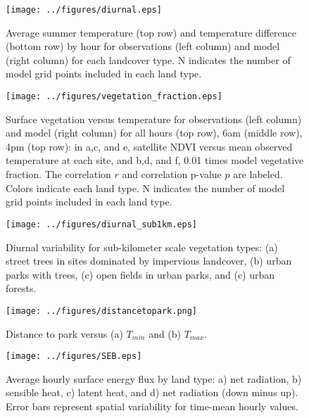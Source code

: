 \documentclass[draft,linenumbers]{agujournal}
\begin{document}
\begin{figure}[h]
\centering
\texttt{[image: ../figures/diurnal.eps]}
\caption{Average summer temperature (top row) and temperature difference (bottom row) by hour for observations (left column) and model (right column) for each landcover type. N indicates the number of model grid points included in each land type. }
\label{fig:diurnal}
\end{figure}


\begin{figure}[h]
\centering
\texttt{[image: ../figures/vegetation\_fraction.eps]}
\caption{Surface vegetation versus temperature for observations (left column) and model (right column) for all hours (top row), 6am (middle row), 4pm (top row): in a,c, and e, satellite NDVI versus mean observed temperature at each site, and b,d, and f, 0.01 times model vegetative fraction. The correlation $r$ and correlation p-value $p$ are labeled. Colors indicate each land type. N indicates the number of model grid points included in each land type.}
\label{fig:veg}
\end{figure}

\begin{figure}
\centering
\texttt{[image: ../figures/diurnal\_sub1km.eps]}
\caption{Diurnal variability for sub-kilometer scale vegetation types: (a) street trees in sites dominated by impervious landcover, (b) urban parks with trees, (c) open fields in urban parks, and (c) urban forests. }
\label{fig:diurnal_urbanforests_etc}
\end{figure}

\begin{figure}
\centering
\texttt{[image: ../figures/distancetopark.png]}
\caption{Distance to park versus (a) $T_{min}$ and (b) $T_{max}$.}
\label{fig:distance to park}
\end{figure}


\begin{figure}[h]
\centering
\texttt{[image: ../figures/SEB.eps]}
\caption{Average hourly surface energy flux by land type: a) net radiation, b) sensible heat, c) latent heat, and d) net radiation (down minus up). Error bars represent spatial variability for time-mean hourly values.}
\label{fig:seb}
\end{figure}
\end{document}

